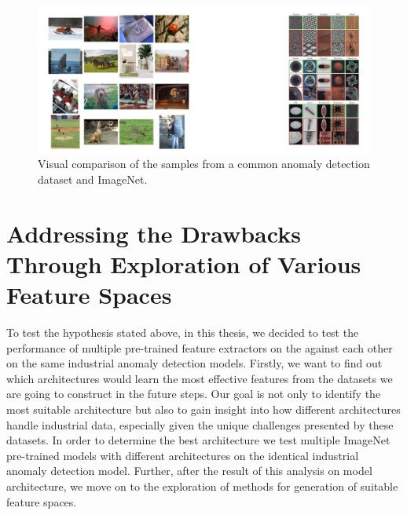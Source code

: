 \begin{figure}[t]
	\begin{center}
		\includegraphics[width=1.0\linewidth]{Chapter_3/discrepancy.png}
	\end{center}
	\caption{Visual comparison of the samples from a common anomaly detection dataset and ImageNet.\cite{mvtecad}\cite{imagenet}}
	\label{fig:discrepancy}
\end{figure} 	

\section{Addressing the Drawbacks Through Exploration of Various Feature Spaces}
To test the hypothesis stated above, in this thesis, we decided to test the performance of multiple pre-trained feature extractors on the against each other on the same industrial anomaly detection models. Firstly, we want to find out which architectures would learn the most effective features from the datasets we are going to construct in the future steps. Our goal is not only to identify the most suitable architecture but also to gain insight into how different architectures handle industrial data, especially given the unique challenges presented by these datasets. In order to determine the best architecture we test multiple ImageNet pre-trained models with different architectures on the identical industrial anomaly detection model. Further, after the result of this analysis on model architecture, we move on to the exploration of methods for generation of suitable feature spaces.

